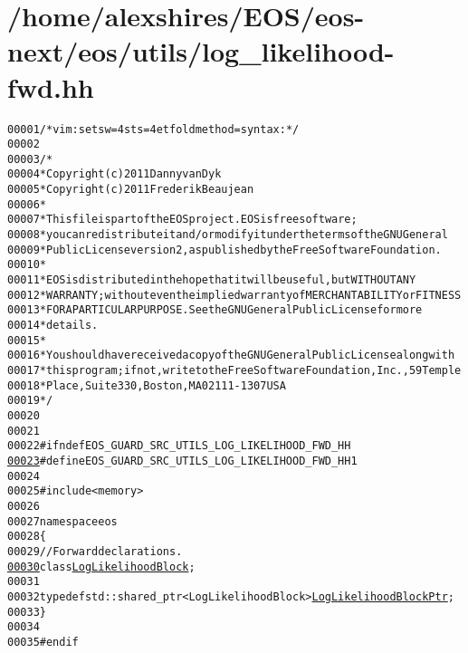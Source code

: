 \hypertarget{log__likelihood-fwd_8hh_source}{
\section{/home/alexshires/EOS/eos-\/next/eos/utils/log\_\-likelihood-\/fwd.hh}
}


\begin{footnotesize}\begin{alltt}
00001 \textcolor{comment}{/* vim: set sw=4 sts=4 et foldmethod=syntax : */}
00002 
00003 \textcolor{comment}{/*}
00004 \textcolor{comment}{ * Copyright (c) 2011 Danny van Dyk}
00005 \textcolor{comment}{ * Copyright (c) 2011 Frederik Beaujean}
00006 \textcolor{comment}{ *}
00007 \textcolor{comment}{ * This file is part of the EOS project. EOS is free software;}
00008 \textcolor{comment}{ * you can redistribute it and/or modify it under the terms of the GNU General}
00009 \textcolor{comment}{ * Public License version 2, as published by the Free Software Foundation.}
00010 \textcolor{comment}{ *}
00011 \textcolor{comment}{ * EOS is distributed in the hope that it will be useful, but WITHOUT ANY}
00012 \textcolor{comment}{ * WARRANTY; without even the implied warranty of MERCHANTABILITY or FITNESS}
00013 \textcolor{comment}{ * FOR A PARTICULAR PURPOSE.  See the GNU General Public License for more}
00014 \textcolor{comment}{ * details.}
00015 \textcolor{comment}{ *}
00016 \textcolor{comment}{ * You should have received a copy of the GNU General Public License along with}
00017 \textcolor{comment}{ * this program; if not, write to the Free Software Foundation, Inc., 59 Temple}
00018 \textcolor{comment}{ * Place, Suite 330, Boston, MA  02111-1307  USA}
00019 \textcolor{comment}{ */}
00020 
00021 
00022 \textcolor{preprocessor}{#ifndef EOS\_GUARD\_SRC\_UTILS\_LOG\_LIKELIHOOD\_FWD\_HH}
\hypertarget{log__likelihood-fwd_8hh_source_l00023}{}\hyperlink{log__likelihood-fwd_8hh_a6d7160af9fc02d37e751270f6e914bec}{00023} \textcolor{preprocessor}{}\textcolor{preprocessor}{#define EOS\_GUARD\_SRC\_UTILS\_LOG\_LIKELIHOOD\_FWD\_HH 1}
00024 \textcolor{preprocessor}{}
00025 \textcolor{preprocessor}{#include <memory>}
00026 
00027 \textcolor{keyword}{namespace }eos
00028 \{
00029     \textcolor{comment}{// Forward declarations.}
\hypertarget{log__likelihood-fwd_8hh_source_l00030}{}\hyperlink{namespaceeos_ab823a6782e060c440e05a614158ad1bf}{00030}     \textcolor{keyword}{class }\hyperlink{classeos_1_1LogLikelihoodBlock}{LogLikelihoodBlock};
00031 
00032     \textcolor{keyword}{typedef} std::shared\_ptr<LogLikelihoodBlock> \hyperlink{namespaceeos_ab823a6782e060c440e05a614158ad1bf}{LogLikelihoodBlockPtr};
00033 \}
00034 
00035 \textcolor{preprocessor}{#endif}
\end{alltt}\end{footnotesize}
